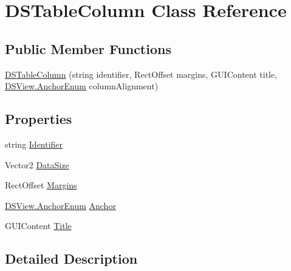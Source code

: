 \hypertarget{class_d_s_table_column}{\section{D\+S\+Table\+Column Class Reference}
\label{class_d_s_table_column}
}
\subsection*{Public Member Functions}
\begin{DoxyCompactItemize}
\item 
\hyperlink{class_d_s_table_column_afc8bbbe1da3832d584ee1054f901c877}{D\+S\+Table\+Column} (string identifier, Rect\+Offset margins, G\+U\+I\+Content title, \hyperlink{class_d_s_view_a8b41b9ec1b18bd33872a37cbd3a2dbe1}{D\+S\+View.\+Anchor\+Enum} column\+Alignment)
\end{DoxyCompactItemize}
\subsection*{Properties}
\begin{DoxyCompactItemize}
\item 
string \hyperlink{class_d_s_table_column_aae185a69d6fae35e72bcf9a2c689a7ce}{Identifier}
\item 
Vector2 \hyperlink{class_d_s_table_column_abdaa3a0ee9883799cf84a0ffae774ef5}{Data\+Size}
\item 
Rect\+Offset \hyperlink{class_d_s_table_column_aeec7c3f50e4bb3b6c7f71c4f39200bde}{Margins}
\item 
\hyperlink{class_d_s_view_a8b41b9ec1b18bd33872a37cbd3a2dbe1}{D\+S\+View.\+Anchor\+Enum} \hyperlink{class_d_s_table_column_a829c075d7189ec076ec5811e60e9e794}{Anchor}
\item 
G\+U\+I\+Content \hyperlink{class_d_s_table_column_ace0d678efe1f5fdd5d43243fc7904fa4}{Title}
\end{DoxyCompactItemize}


\subsection{Detailed Description}


